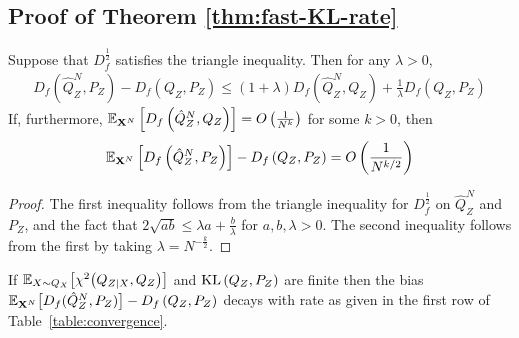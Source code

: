 \subsection{Proof of Theorem \ref{thm:fast-KL-rate}}\label{appendix:subsec:thm1}

\begin{lemma}\label{lemma:hilbertian-triangle}
Suppose that $D_f^{\frac{1}{2}}$ satisfies the triangle inequality.
Then for any $\lambda>0$,
\begin{align*}
    D_f\left(\hat{Q}^N_Z , P_Z\right) - D_f\left(Q_{Z} , P_Z\right) \leq (1+\lambda) D_f\left(\hat{Q}^N_Z , Q_Z \right) +  \frac{1}{\lambda} D_f\left(Q_{Z} , P_Z \right)
\end{align*}
If, furthermore, $\mathbb{E}_{\mathbf{X}^N}\left[ D_f\left(\hat{Q}^N_Z , Q_Z\right)\right] = O\left( \frac{1}{N^k} \right)$ 
for some $k>0$, 
then
\begin{align*}
    \mathbb{E}_{\mathbf{X}^N}\left[ D_f\left(\hat{Q}^N_Z , P_Z\right) \right] - D_f\left(Q_{Z} , P_Z\right) = O\left( \frac{1}{N^{k/2}} \right)
\end{align*}
\end{lemma}
\begin{proof}
The first inequality follows from the triangle inequality for $D_f^{\frac{1}{2}}$ on $\hat{Q}^N_Z$ and $P_Z$, and the fact that $2\sqrt{ab} \leq \lambda a + \frac{b}{\lambda}$ for ${a, b, \lambda>0}$.
The second inequality follows from the first by taking $\lambda = N^{-\frac{k}{2}}$.
\end{proof}


\begin{theorem}
If
$\mathbb{E}_{X\sim Q_X}\bigl[\chi^2\bigl(Q_{Z|X}, Q_Z\bigr)\bigr]$ and
$\mathrm{KL}\left( Q_{Z} , P_Z\right)$ are finite then the bias ${\mathbb{E}_{\mathbf{X}^N}\bigl[D_f( \hat{Q}_Z^N , P_Z)\bigr] - D_f\left( Q_{Z} , P_Z\right)}$ decays with rate as given in the first row of Table~\ref{table:convergence}.
\end{theorem}

